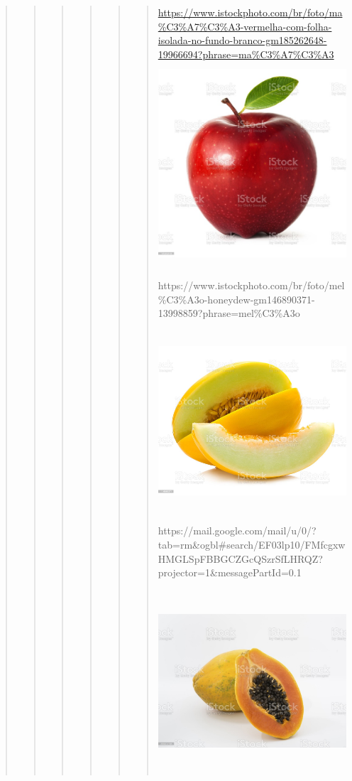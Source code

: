 \begin{boxlist}
{{\begin{quote}
\begin{quote}
\begin{quote}
{\begin{quote}
{\begin{quote}
\begin{quote}
\href{https://www.istockphoto.com/br/foto/ma\%C3\%A7\%C3\%A3-vermelha-com-folha-isolada-no-fundo-branco-gm185262648-19966694?phrase=ma\%C3\%A7\%C3\%A3}{https://www.istockphoto.com/br/foto/ma\%C3\%A7\%C3\%A3-vermelha-com-folha-isolada-no-fundo-branco-gm185262648-19966694?phrase=ma\%C3\%A7\%C3\%A3\includegraphics[width=2.98958in,height=2.98958in]{media/image38.jpeg}}

https://www.istockphoto.com/br/foto/mel\%C3\%A3o-honeydew-gm146890371-13998859?phrase=mel\%C3\%A3o

\includegraphics[width=3.33412in,height=2.64722in]{media/image39.jpeg}

https://mail.google.com/mail/u/0/?tab=rm\&ogbl\#search/EF03lp10/FMfcgxwHMGLSpFBBGCZGcQSzrSfLHRQZ?projector=1\&messagePartId=0.1

\includegraphics[width=3.76501in,height=2.67500in]{media/image40.jpeg}


\end{quote}
\end{quote}}
\end{quote}}
\end{quote}
\end{quote}
\end{quote}}}
\end{boxlist}
